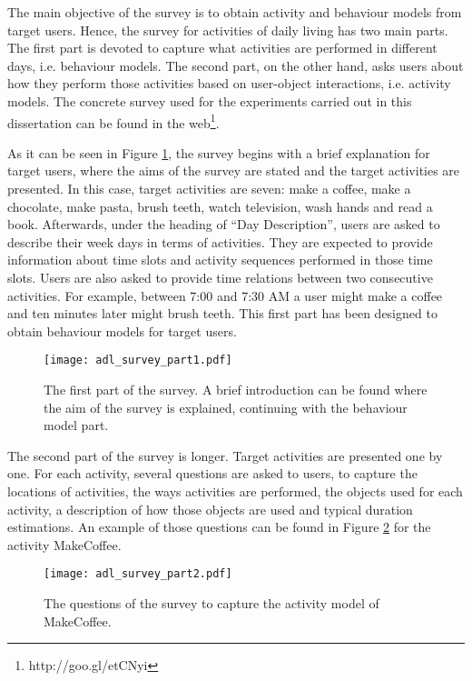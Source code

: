 The main objective of the survey is to obtain activity and behaviour models from target users. Hence, the survey for activities of daily living has two main parts. The first part is devoted to capture what activities are performed in different days, i.e. behaviour models. The second part, on the other hand, asks users about how they perform those activities based on user-object interactions, i.e. activity models. The concrete survey used for the experiments carried out in this dissertation can be found in the web\footnote{http://goo.gl/etCNyi}. 

As it can be seen in Figure \ref{fig-survey-1}, the survey begins with a brief explanation for target users, where the aims of the survey are stated and the target activities are presented. In this case, target activities are seven: make a coffee, make a chocolate, make pasta, brush teeth, watch television, wash hands and read a book. Afterwards, under the heading of ``Day Description'', users are asked to describe their week days in terms of activities. They are expected to provide information about time slots and activity sequences performed in those time slots. Users are also asked to provide time relations between two consecutive activities. For example, between 7:00 and 7:30 AM a user might make a coffee and ten minutes later might brush teeth. This first part has been designed to obtain behaviour models for target users.

\begin{figure}[htbp]
\centering
\texttt{[image: adl\_survey\_part1.pdf]}
    \caption{The first part of the survey. A brief introduction can be found where the aim of the survey is explained, continuing with the behaviour model part.}
    \label{fig-survey-1}
\end{figure}

The second part of the survey is longer. Target activities are presented one by one. For each activity, several questions are asked to users, to capture the locations of activities, the ways activities are performed, the objects used for each activity, a description of how those objects are used and typical duration estimations. An example of those questions can be found in Figure \ref{fig-survey-2} for the activity MakeCoffee.

\begin{figure}[htbp]
\centering
\texttt{[image: adl\_survey\_part2.pdf]}
    \caption{The questions of the survey to capture the activity model of MakeCoffee.}
    \label{fig-survey-2}
\end{figure}


